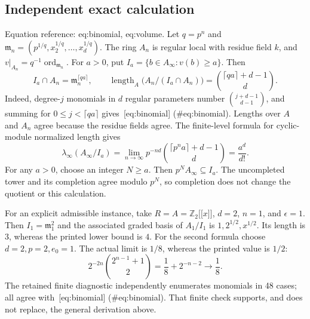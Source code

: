 \documentclass[10pt]{article}
\begin{document}
\subsection*{Independent exact calculation}
Equation reference: eq:binomial, eq:volume. Let \(q=p^n\) and \(\mathfrak m_n=(p^{1/q},x_2^{1/q},\ldots,x_d^{1/q})\). The ring \(A_n\) is regular local with residue field \(k\), and \(v|_{A_n}=q^{-1}\operatorname{ord}_{\mathfrak m_n}\). For \(a>0\), put \(I_a=\{b\in A_\infty:v(b)\geq a\}\). Then \[
 I_a\cap A_n=\mathfrak m_n^{\lceil qa\rceil},
 \qquad
 \operatorname{length}_A\bigl(A_n/(I_a\cap A_n)\bigr)
   =\binom{\lceil qa\rceil+d-1}{d}.\] Indeed, degree-\(j\) monomials in \(d\) regular parameters number \(\binom{j+d-1}{d-1}\), and summing for \(0\leq j<\lceil qa\rceil\) gives [eq:binomial] (\#eq:binomial). Lengths over \(A\) and \(A_n\) agree because the residue fields agree. The finite-level formula for cyclic-module normalized length gives \[
 \lambda_\infty(A_\infty/I_a)
 =\lim_{n\to\infty}p^{-nd}
     \binom{\lceil p^n a\rceil+d-1}{d}
 =\frac{a^d}{d!}.\] For any \(a>0\), choose an integer \(N\geq a\). Then \(p^N A_\infty\subseteq I_a\). The uncompleted tower and its completion agree modulo \(p^N\), so completion does not change the quotient or this calculation.\par
For an explicit admissible instance, take \(R=A=\mathbb Z_2\mathopen{[\![}
x\mathclose{]\!]}\), \(d=2\), \(n=1\), and \(\epsilon=1\). Then \(I_1=\mathfrak m_1^2\) and the associated graded basis of \(A_1/I_1\) is \(1,2^{1/2},x^{1/2}\). Its length is \(3\), whereas the printed lower bound is \(4\). For the second formula choose \(d=2,p=2,e_0=1\). The actual limit is \(1/8\), whereas the printed value is \(1/2\): \[2^{-2n}\binom{2^{n-1}+1}{2}
   =\frac18+2^{-n-2}\longrightarrow\frac18 .\] The retained finite diagnostic independently enumerates monomials in 48 cases; all agree with [eq:binomial] (\#eq:binomial). That finite check supports, and does not replace, the general derivation above.\par
\end{document}
